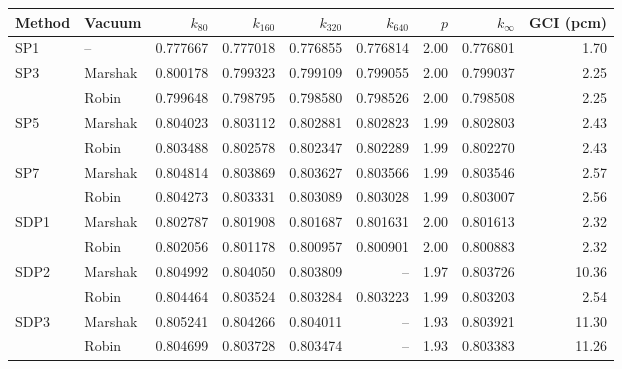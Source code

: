 \begin{tabular}{llrrrrrrr}
\hline
Method & Vacuum & $k_{80}$ & $k_{160}$ & $k_{320}$ & $k_{640}$ & $p$ & $k_\infty$ & GCI (pcm) \\
\hline
SP1 & -- & 0.777667 & 0.777018 & 0.776855 & 0.776814 & 2.00 & 0.776801 & 1.70 \\
SP3 & Marshak & 0.800178 & 0.799323 & 0.799109 & 0.799055 & 2.00 & 0.799037 & 2.25 \\
 & Robin & 0.799648 & 0.798795 & 0.798580 & 0.798526 & 2.00 & 0.798508 & 2.25 \\
SP5 & Marshak & 0.804023 & 0.803112 & 0.802881 & 0.802823 & 1.99 & 0.802803 & 2.43 \\
 & Robin & 0.803488 & 0.802578 & 0.802347 & 0.802289 & 1.99 & 0.802270 & 2.43 \\
SP7 & Marshak & 0.804814 & 0.803869 & 0.803627 & 0.803566 & 1.99 & 0.803546 & 2.57 \\
 & Robin & 0.804273 & 0.803331 & 0.803089 & 0.803028 & 1.99 & 0.803007 & 2.56 \\
SDP1 & Marshak & 0.802787 & 0.801908 & 0.801687 & 0.801631 & 2.00 & 0.801613 & 2.32 \\
 & Robin & 0.802056 & 0.801178 & 0.800957 & 0.800901 & 2.00 & 0.800883 & 2.32 \\
SDP2 & Marshak & 0.804992 & 0.804050 & 0.803809 & -- & 1.97 & 0.803726 & 10.36 \\
 & Robin & 0.804464 & 0.803524 & 0.803284 & 0.803223 & 1.99 & 0.803203 & 2.54 \\
SDP3 & Marshak & 0.805241 & 0.804266 & 0.804011 & -- & 1.93 & 0.803921 & 11.30 \\
 & Robin & 0.804699 & 0.803728 & 0.803474 & -- & 1.93 & 0.803383 & 11.26 \\
\hline
\end{tabular}
